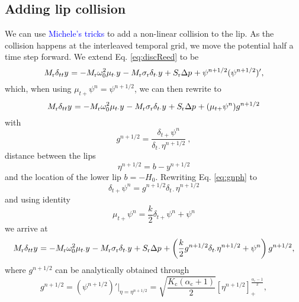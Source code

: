 \documentclass[dvipsnames]{article}
\def\SWcomment[#1]{\textcolor{blue}{#1}}
\begin{document}
\subsection{Adding lip collision}
We can use \SWcomment[Michele's tricks] to add a non-linear collision to the lip. As the collision happens at the interleaved temporal grid, we move the potential half a time step forward. We extend Eq. \eqref{eq:discReed} to be
\begin{equation}
    M_\text{r}\delta_{tt}y^{} = -M_\text{r}\omega_0^2\mu_{t\cdot}y^{}-M_\text{r}\sigma_\text{r}\delta_{t\cdot}y^{} + S_\text{r}\Delta p^{} + \psi^{n+1/2}(\psi^{n+1/2})', 
\end{equation}
which, when using $\mu_{t+}\psi^n = \psi^{n+1/2}$, we can then rewrite to
\begin{equation}
    M_\text{r}\delta_{tt}y^{} = -M_\text{r}\omega_0^2\mu_{t\cdot}y^{}-M_\text{r}\sigma_\text{r}\delta_{t\cdot}y^{} + S_\text{r}\Delta p^{} + (\mu_{t+}\psi^n)g^{n+1/2} 
\end{equation}
with
\begin{equation}\label{eq:gnph}
    g^{n+1/2} = \frac{\delta_{t+}\psi^n}{\delta_{t\cdot}\eta^{n+1/2}}\ ,
\end{equation}
distance between the lips
\begin{equation}\label{eq:etaBarrier}
    \eta^{n+1/2} = b - y^{n+1/2}
\end{equation}
and the location of the lower lip $b = -H_0$. Rewriting Eq. \eqref{eq:gnph} to
\begin{equation}\label{eq:rewrittenPsi}
    \delta_{t+}\psi^n = g^{n+1/2}\delta_{t\cdot}\eta^{n+1/2}
\end{equation}
and using identity
\begin{equation}
    \mu_{t+}\psi^n = \frac{k}{2}\delta_{t+}\psi^n + \psi^n
\end{equation} 
we arrive at
\begin{equation}
    M_\text{r}\delta_{tt}y^{} = -M_\text{r}\omega_0^2\mu_{t\cdot}y^{}-M_\text{r}\sigma_\text{r}\delta_{t\cdot}y^{} + S_\text{r}\Delta p^{} + \left(\frac{k}{2}g^{n+1/2}\delta_{t\cdot}\eta^{n+1/2} + \psi^n\right)g^{n+1/2},
\end{equation}
where $g^{n+1/2}$ can be analytically obtained through 
\begin{equation}\label{eq:gAnalytic}
    g^{n+1/2} = (\psi^{n+1/2})'\bigg\rvert_{\eta = \eta^{n+1/2}} = \sqrt{\frac{K_\text{c}(\alpha_\text{c} + 1)}{2}}[\eta^{n+1/2}]_+^{\frac{\alpha_\text{c}-1}{2}},
\end{equation}
\end{document}
